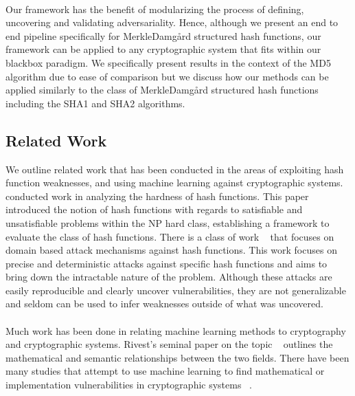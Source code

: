 \documentclass[letterpaper,twocolumn,10pt]{article}
\begin{document}
\\
Our framework has the benefit of modularizing the process of defining, uncovering and validating adversariality. Hence, although we present an end to end pipeline specifically for Merkle{\textendash}Damg\r{a}rd structured hash functions, our framework can be applied to any cryptographic system that fits within our blackbox paradigm. We specifically present results in the context of the MD5 algorithm due to ease of comparison but we discuss how our methods can be applied similarly to the class of Merkle{\textendash}Damg\r{a}rd structured hash functions including the SHA1 and SHA2 algorithms. 

\subsection{Related Work}
We outline related work that has been conducted in the areas of exploiting hash function weaknesses, and using machine learning against cryptographic systems. ~\cite{jovanovic2005logical, rivest1991cryptography} conducted work in analyzing the hardness of hash functions. This paper introduced the notion of hash functions with regards to satisfiable and unsatisfiable problems within the NP hard class, establishing a framework to evaluate the class of hash functions. There is a class of work ~\cite{liang2007improved, stevens2017speeding, stevens2012attacks, de2007collisions, de2006finding,  den1993collisions} that focuses on domain based attack mechanisms against hash functions. This work focuses on precise and deterministic attacks against specific hash functions and aims to bring down the intractable nature of the problem. Although these attacks are easily reproducible and clearly uncover vulnerabilities, they are not generalizable and seldom can be used to infer weaknesses outside of what was uncovered.
\\
\\
Much work has been done in relating machine learning methods to cryptography and cryptographic systems. Rivest's seminal paper on the topic ~\cite{rivest1991cryptography} outlines the mathematical and semantic relationships between the two fields. There have been many studies that attempt to use machine learning to find mathematical or implementation vulnerabilities in cryptographic systems ~\cite{hospodar2011machine, graepel2012ml}. 
\\
\end{document}
